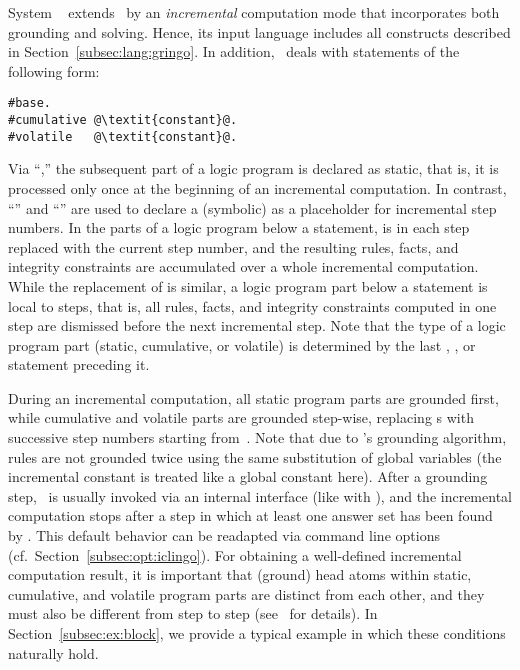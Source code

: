 System \iclingo~\cite{gekakaosscth08a} extends \clingo\ by an
\emph{incremental} computation mode that incorporates both grounding and solving.
Hence, its input language includes all constructs described
in Section~\ref{subsec:lang:gringo}.
In addition, \iclingo\ deals with statements of the following form:
%
\begin{lstlisting}[numbers=none,escapechar=@]
#base.
#cumulative @\textit{constant}@.
#volatile   @\textit{constant}@.
\end{lstlisting}
%
%
%
Via ``,''
the subsequent part of a logic program is declared as static, that is,
it is processed only once at the beginning of an incremental computation.
In contrast, ``''
and ``'' are used to declare
a (symbolic)  as a placeholder for incremental step numbers.
In the parts of a logic program below a  statement,
 is in each step replaced with the current step number,
and the resulting rules, facts, and integrity constraints are accumulated
over a whole incremental computation.
While the replacement of  is similar,
a logic program part below a  statement is local to steps,
that is, all rules, facts, and integrity constraints computed in one step
are dismissed before the next incremental step.
Note that the type of a logic program part (static, cumulative, or volatile)
is determined by the last
%
%
%
%
, , or  statement
preceding it.

During an incremental computation, all static program parts are grounded first,
while cumulative and volatile parts are grounded step-wise,
replacing s with successive step numbers starting from~.
Note that due to \gringo's grounding algorithm,
rules are not grounded twice using the same substitution of global variables
(the incremental constant is treated like a global constant here).
After a grounding step, \clasp\ is usually invoked via an internal interface
(like with \clingo), and the incremental computation stops after a step
in which at least one answer set has been found by \clasp.
This default behavior can be readapted via command line 
options (cf.\ Section~\ref{subsec:opt:iclingo}).
For obtaining a well-defined incremental computation result,
it is important that (ground) head atoms within static, cumulative, and volatile program parts
are distinct from each other, and they must also be different from step to step
(see~\cite{gekakaosscth08a} for details).
In Section~\ref{subsec:ex:block},
we provide a typical example in which these conditions naturally hold.

